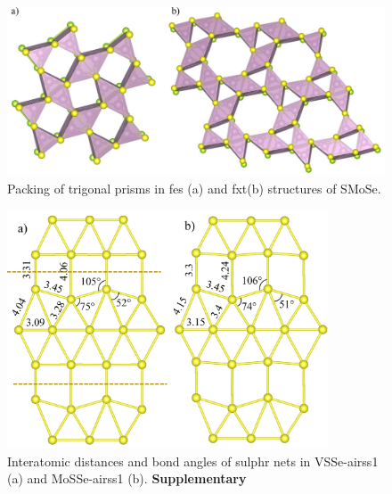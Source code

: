 \documentclass[a4paperm]{article}
\begin{document}
\begin{figure}[H]
	\includegraphics[width=\textwidth]{fes_fxt.png}
	\caption{Packing of trigonal prisms in fes (a) and fxt(b) structures of SMoSe.}
	\label{fes_fxt}
\end{figure}

\begin{figure}
	\includegraphics[width=0.85\textwidth]{airss1_s_comp.png}
	\caption{Interatomic distances and bond angles of sulphr nets in VSSe-airss1 (a) and MoSSe-airss1 (b). \bf{Supplementary}}
	\label{airss1_s_comp}
\end{figure}
\end{document}
